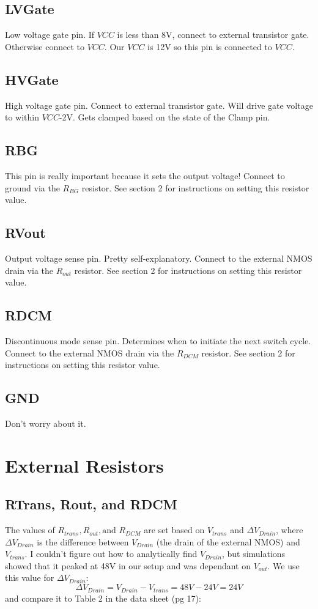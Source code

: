 \documentclass{article}
\begin{document}
	\subsection{LVGate}
	Low voltage gate pin. If $VCC$ is less than 8V, connect to external transistor gate. Otherwise connect to $VCC$. Our $VCC$ is 12V so this pin is connected to $VCC$. 
	
	\subsection{HVGate}
	High voltage gate pin. Connect to external transistor gate. Will drive gate voltage to within $VCC$-2V. Gets clamped based on the state of the Clamp pin.
	
	\subsection{RBG}
	This pin is really important because it sets the output voltage! Connect to ground via the $R_{BG}$ resistor. See section 2 for instructions on setting this resistor value.
	
	\subsection{RVout}
	Output voltage sense pin. Pretty self-explanatory. Connect to the external NMOS drain via the $R_{out}$ resistor. See section 2 for instructions on setting this resistor value.
	
	\subsection{RDCM}
	Discontinuous mode sense pin. Determines when to initiate the next switch cycle. Connect to the external NMOS drain via the $R_{DCM}$ resistor. See section 2 for instructions on setting this resistor value.
	
	\subsection{GND}
	Don't worry about it.
	
	\section{External Resistors}
	\subsection{RTrans, Rout, and RDCM}
	The values of $R_{trans}, R_{out}, \text{and } R_{DCM}$ are set based on $V_{trans}$ and $\Delta V_{Drain}$, where $\Delta V_{Drain}$ is the difference between $V_{Drain}$ (the drain of the external NMOS) and $V_{trans}$. I couldn't figure out how to analytically find $V_{Drain}$, but simulations showed that it peaked at 48V in our setup and was dependant on $V_{out}$. We use this value for $\Delta V_{Drain}$:
	\[\Delta V_{Drain} = V_{Drain} - V_{trans} = 48V - 24V = 24V\]
	and compare it to Table 2 in the data sheet (pg 17):
	
\end{document}
